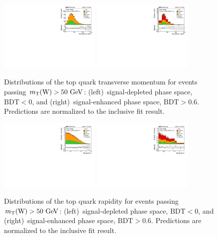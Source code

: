 \documentclass[12pt]{article}
\begin{document}
\begin{figure}[!htbp]
\begin{center}
\includegraphics[width=0.43\textwidth]{figures/unfolding/reco_toppt_bdtinv.pdf}\hspace{0.05\textwidth}
\includegraphics[width=0.43\textwidth]{figures/unfolding/reco_toppt_bdt.pdf}
\end{center}

\caption{\label{fig:recotop-pt}Distributions of the top quark transverse momentum for events passing $m_{\mathrm{T}}(\mathrm{W})>50~\mathrm{GeV}$: (left)~signal-depleted phase space, $\mathrm{BDT}<0$, and (right)~signal-enhanced phase space, $\mathrm{BDT}>0.6$. Predictions are normalized to the inclusive fit result.}
\end{figure}

\begin{figure}[!htbp]
\begin{center}
\includegraphics[width=0.43\textwidth]{figures/unfolding/reco_topy_bdtinv.pdf}\hspace{0.05\textwidth}
\includegraphics[width=0.43\textwidth]{figures/unfolding/reco_topy_bdt.pdf}
\end{center}

\caption{\label{fig:recotop-y}Distributions of the top quark rapidity for events passing $m_{\mathrm{T}}(\mathrm{W})>50~\mathrm{GeV}$: (left)~signal-depleted phase space, $\mathrm{BDT}<0$, and (right)~signal-enhanced phase space, $\mathrm{BDT}>0.6$. Predictions are normalized to the inclusive fit result.}
\end{figure}
\end{document}
